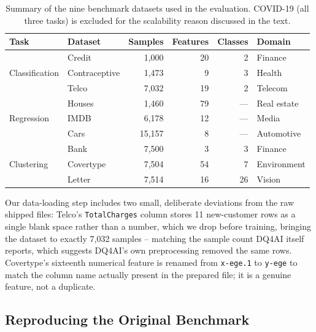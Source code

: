 \documentclass[runningheads]{llncs}
\begin{document}
\begin{table}[t]
\centering
\caption{Summary of the nine benchmark datasets used in the
evaluation. COVID-19 (all three tasks) is excluded for the
scalability reason discussed in the text.}
\label{tab:datasets}
\small
\begin{tabular}{@{}llrrrl@{}}
\toprule
\textbf{Task} & \textbf{Dataset} & \textbf{Samples} & \textbf{Features} & \textbf{Classes} & \textbf{Domain} \\
\midrule
\multirow{3}{*}{Classification}
  & Credit        & 1{,}000     & 20 & 2 & Finance     \\
  & Contraceptive & 1{,}473     & 9  & 3 & Health      \\
  & Telco         & 7{,}032     & 19 & 2 & Telecom     \\
\midrule
\multirow{3}{*}{Regression}
  & Houses        & 1{,}460     & 79 & --- & Real estate \\
  & IMDB          & 6{,}178     & 12 & --- & Media       \\
  & Cars          & 15{,}157    & 8  & --- & Automotive  \\
\midrule
\multirow{3}{*}{Clustering}
  & Bank          & 7{,}500     & 3  & 3 & Finance     \\
  & Covertype     & 7{,}504     & 54 & 7 & Environment \\
  & Letter        & 7{,}514     & 16 & 26 & Vision    \\
\bottomrule
\end{tabular}
\end{table}

Our data-loading step includes two small, deliberate deviations from
the raw shipped files: Telco's \texttt{TotalCharges} column stores 11
new-customer rows as a single blank space rather than a number, which
we drop before training, bringing the dataset to exactly 7,032
samples -- matching the sample count DQ4AI itself reports, which
suggests DQ4AI's own preprocessing removed the same rows. Covertype's
sixteenth numerical feature is renamed from \texttt{x-ege.1} to
\texttt{y-ege} to match the column name actually present in the
prepared file; it is a genuine feature, not a duplicate.

\subsection{Reproducing the Original Benchmark}
\label{sec:reproduction}
\end{document}
